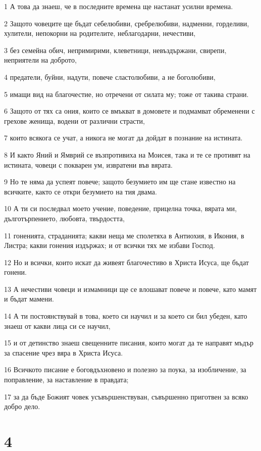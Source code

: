 \par 1 А това да знаеш, че в последните времена ще настанат усилни времена.
\par 2 Защото човеците ще бъдат себелюбиви, сребрелюбиви, надменни, горделиви, хулители, непокорни на родителите, неблагодарни, нечестиви,
\par 3 без семейна обич, непримирими, клеветници, невъздържани, свирепи, неприятели на доброто,
\par 4 предатели, буйни, надути, повече сластолюбиви, а не боголюбиви,
\par 5 имащи вид на благочестие, но отречени от силата му; тоже от такива страни.
\par 6 Защото от тях са ония, които се вмъкват в домовете и подмамват обременени с грехове женища, водени от различни страсти,
\par 7 които всякога се учат, а никога не могат да дойдат в познание на истината.
\par 8 И както Яний и Ямврий се възпротивиха на Моисея, така и те се противят на истината, човеци с покварен ум, извратени във вярата.
\par 9 Но те няма да успеят повече; защото безумието им ще стане известно на всичките, както се откри безумието на тия двама.
\par 10 А ти си последвал моето учение, поведение, прицелна точка, вярата ми, дълготърпението, любовта, твърдостта,
\par 11 гоненията, страданията; какви неща ме сполетяха в Антиохия, в Икония, в Листра; какви гонения издържах; и от всички тях ме избави Господ.
\par 12 Но и всички, които искат да живеят благочестиво в Христа Исуса, ще бъдат гонени.
\par 13 А нечестиви човеци и измамници ще се влошават повече и повече, като мамят и бъдат мамени.
\par 14 А ти постоянствувай в това, което си научил и за което си бил убеден, като знаеш от какви лица си се научил,
\par 15 и от детинство знаеш свещенните писания, които могат да те направят мъдър за спасение чрез вяра в Христа Исуса.
\par 16 Всичкото писание е боговдъхновено и полезно за поука, за изобличение, за поправление, за наставление в правдата;
\par 17 за да бъде Божият човек усъвършенствуван, съвършенно приготвен за всяко добро дело.

\chapter{4}

